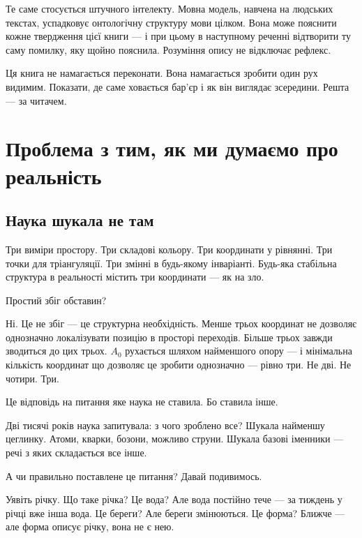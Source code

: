 \documentclass[12pt, a4paper, openany]{book}
\begin{document}
Те саме стосується штучного інтелекту. Мовна модель, навчена на людських текстах, успадковує онтологічну структуру мови цілком. Вона може пояснити кожне твердження цієї книги — і при цьому в наступному реченні відтворити ту саму помилку, яку щойно пояснила. Розуміння опису не відключає рефлекс.

\bigskip

Ця книга не намагається переконати. Вона намагається зробити один рух видимим. Показати, де саме ховається бар'єр і як він виглядає зсередини. Решта — за читачем.

\clearpage
\tableofcontents
\clearpage

\part{Проблема з тим, як ми думаємо про реальність}

\chapter{Наука шукала не там}

Три виміри простору. Три складові кольору. Три координати у рівнянні. Три точки для тріангуляції. Три змінні в будь-якому інваріанті. Будь-яка стабільна структура в реальності містить три координати --- як на зло.

Простий збіг обставин?

Ні. Це не збіг --- це структурна необхідність. Менше трьох координат не дозволяє однозначно локалізувати позицію в просторі переходів. Більше трьох завжди зводиться до цих трьох. $A_0$ рухається шляхом найменшого опору --- і мінімальна кількість координат що дозволяє це зробити однозначно --- рівно три. Не дві. Не чотири. Три.

Це відповідь на питання яке наука не ставила. Бо ставила інше.

Дві тисячі років наука запитувала: з чого зроблено все? Шукала найменшу цеглинку. Атоми, кварки, бозони, можливо струни. Шукала базові іменники --- речі з яких складається все інше.

А чи правильно поставлене це питання? Давай подивимось.

Уявіть річку. Що таке річка? Це вода? Але вода постійно тече --- за тиждень у річці вже інша вода. Це береги? Але береги змінюються. Це форма? Ближче --- але форма описує річку, вона не є нею.
\end{document}
